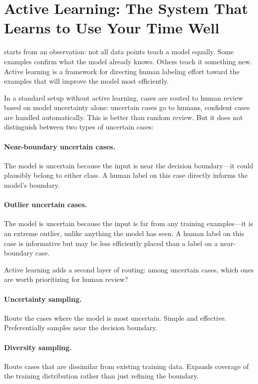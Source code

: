 \section{Active Learning: The System That Learns to Use Your Time Well}
\label{sec:ch17-active-learning}

 starts from an observation: not all data points teach a model equally. Some examples confirm what the model already knows. Others teach it something new. Active learning is a framework for directing human labeling effort toward the examples that will improve the model most efficiently.

In a standard \hitl setup without active learning, cases are routed to human review based on model uncertainty alone: uncertain cases go to humans, confident cases are handled automatically. This is better than random review. But it does not distinguish between two types of uncertain cases:

\paragraph{Near-boundary uncertain cases.} The model is uncertain because the input is near the decision boundary---it could plausibly belong to either class. A human label on this case directly informs the model's boundary.

\paragraph{Outlier uncertain cases.} The model is uncertain because the input is far from any training examples---it is an extreme outlier, unlike anything the model has seen. A human label on this case is informative but may be less efficiently placed than a label on a near-boundary case.

Active learning adds a second layer of routing: among uncertain cases, which ones are worth prioritizing for human review?

\paragraph{Uncertainty sampling.} Route the cases where the model is most uncertain. Simple and effective. Preferentially samples near the decision boundary.

\paragraph{Diversity sampling.} Route cases that are dissimilar from existing training data. Expands coverage of the training distribution rather than just refining the boundary.

